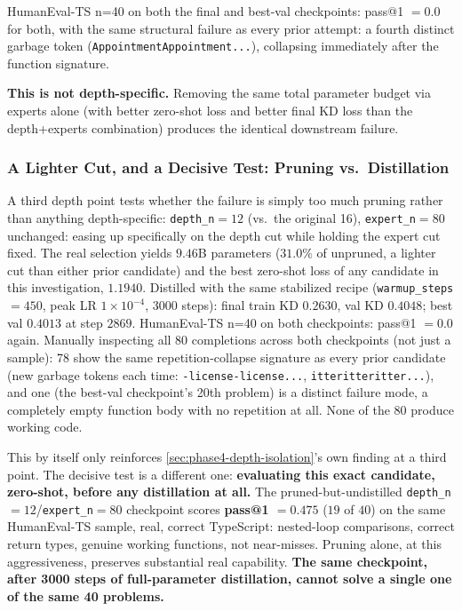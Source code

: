 \documentclass{article}
\theoremstyle{plain}
\theoremstyle{definition}
\theoremstyle{remark}
\begin{document}
HumanEval-TS n=40 on both the final and best-val checkpoints: pass@1
$=0.0$ for both, with the same structural failure as every prior
attempt: a fourth distinct garbage token
(\texttt{AppointmentAppointment...}), collapsing immediately after the
function signature.

\textbf{This is not depth-specific.} Removing the same total parameter
budget via experts alone (with better zero-shot loss and better final
KD loss than the depth+experts combination) produces the identical
downstream failure.

\subsubsection{A Lighter Cut, and a Decisive Test: Pruning vs.\ Distillation}
\label{sec:phase4-pruned-only-diagnostic}

A third depth point tests whether the failure is simply too much pruning
rather than anything depth-specific: \texttt{depth\_n}$=12$ (vs.\ the
original 16), \texttt{expert\_n}$=80$ unchanged: easing up specifically
on the depth cut while holding the expert cut fixed. The real selection
yields $9.46$B parameters ($31.0\%$ of unpruned, a lighter cut than
either prior candidate) and the best zero-shot loss of any candidate in
this investigation, $1.1940$. Distilled with the same stabilized recipe
(\texttt{warmup\_steps}$=450$, peak LR $1\times10^{-4}$, 3000 steps):
final train KD $0.2630$, val KD $0.4048$; best val $0.4013$ at step
$2869$. HumanEval-TS n=40 on both checkpoints: pass@1 $=0.0$ again.
Manually inspecting all 80 completions across both checkpoints (not just
a sample): 78 show the same repetition-collapse signature as every prior
candidate (new garbage tokens each time: \texttt{-license-license...},
\texttt{itteritteritter...}), and one (the best-val checkpoint's 20th
problem) is a distinct failure mode, a completely empty function body
with no repetition at all. None of the 80 produce working code.

This by itself only reinforces \cref{sec:phase4-depth-isolation}'s own
finding at a third point. The decisive test is a different one:
\textbf{evaluating this exact candidate, zero-shot, before any
distillation at all.} The pruned-but-undistilled
\texttt{depth\_n}$=12$/\texttt{expert\_n}$=80$ checkpoint scores
\textbf{pass@1 $=0.475$} ($19$ of $40$) on the same HumanEval-TS sample,
real, correct TypeScript: nested-loop comparisons, correct return types,
genuine working functions, not near-misses. Pruning alone, at this
aggressiveness, preserves substantial real capability. \textbf{The same
checkpoint, after 3000 steps of full-parameter distillation, cannot
solve a single one of the same 40 problems.}
\end{document}
